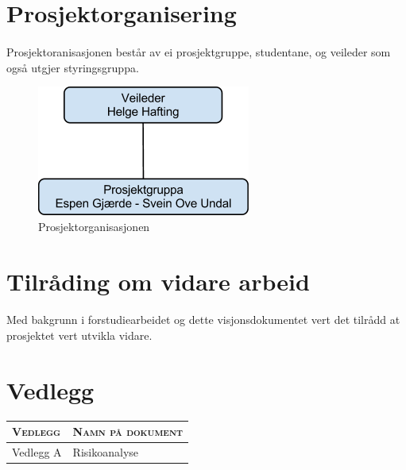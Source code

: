 \documentclass[nynorsk,12pt,a4paper]{article}
\begin{document}
\newpage
\section{Prosjektorganisering}
\paragraph{}
Prosjektoranisasjonen består av ei prosjektgruppe, studentane, og veileder som også utgjer styringsgruppa.

\begin{figure}[h!]
	\centering
	\includegraphics[scale=0.75]{./vdok-img/vdok-org.png}
	\caption{Prosjektorganisasjonen}
\end{figure}

\newpage
\section{Tilråding om vidare arbeid}
\paragraph{}
Med bakgrunn i forstudiearbeidet og dette visjonsdokumentet vert det tilrådd at prosjektet vert utvikla vidare. 

\newpage
\section{Vedlegg}
\begin{table}[h!]
	\begin{tabular}{l l}
		\textsc{Vedlegg} & \textsc{Namn på dokument} \\
		\hline 
		Vedlegg A & Risikoanalyse\\
	\end{tabular}
\end{table}
\end{document}
